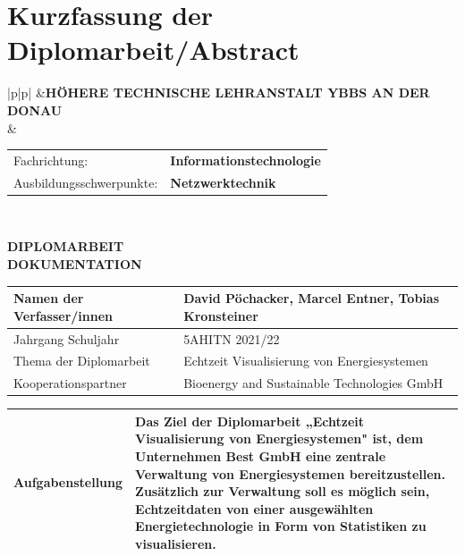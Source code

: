\chapter*{Kurzfassung der Diplomarbeit/Abstract} 



\newlength{\htllogobreite}
\newlength{\beschriftungsbreite}
\newlength{\feldA}
\newlength{\feldB}

\begin{tabular}{|p{\htllogobreite}|p{\beschriftungsbreite}|}
\hline
{}&{\vspace{0.05em}\textbf{HÖHERE TECHNISCHE LEHRANSTALT YBBS AN DER DONAU}}\\[1.05em]
 & { \begin{tabular}{p{\feldA} p{\feldB}}
    Fachrichtung:&\textbf{Informationstechnologie}\\
    Ausbildungsschwerpunkte:&\textbf{Netzwerktechnik}\\
   \end{tabular}
   }\\
\hline
\end{tabular}

\begin{center}
 \LARGE \textbf{DIPLOMARBEIT}\\
 \Large \textbf{DOKUMENTATION}\\
 \normalsize
\end{center}

\newlength{\feldC}
\newlength{\feldD}

\linespread{1.1} \normalsize
\begin{tabular}{|p{\feldC}|p{\feldD}|}
 \hline
 Namen der Verfasser/innen & David Pöchacker, Marcel Entner, Tobias Kronsteiner \\
 \hline
 Jahrgang Schuljahr & 5AHITN  2021/22 \\
 \hline
 Thema der Diplomarbeit &Echtzeit Visualisierung von Energiesystemen \\
 \hline
 Kooperationspartner & Bioenergy and Sustainable Technologies GmbH\\
 \hline
\end{tabular}

\begin{tabular}{|p{\feldC}|p{\feldD}|}
 \hline
 Aufgabenstellung & Das Ziel der Diplomarbeit „Echtzeit Visualisierung von Energiesystemen" ist, dem Unternehmen Best GmbH eine zentrale Verwaltung von Energiesystemen bereitzustellen. Zusätzlich zur Verwaltung soll es möglich sein, Echtzeitdaten von einer ausgewählten Energietechnologie in Form von Statistiken zu visualisieren.\\
 \hline
\end{tabular}

